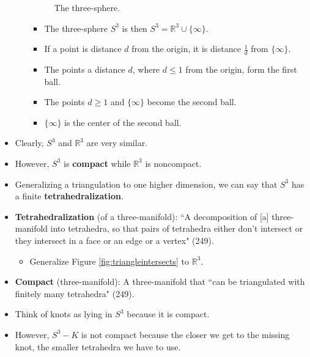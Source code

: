 \documentclass[titlepage]{article}
\numberwithin{figure}{section}
\numberwithin{table}{section}
\numberwithin{equation}{section}
\newcommand{\dq}[2]{``#1" (#2).}
\begin{document}
\begin{itemize}
\begin{itemize}
\begin{figure}[h!]
            \caption{The three-sphere.}
            \label{fig:3-sphere}
        \end{figure}
        \begin{itemize}
            \item The three-sphere $S^3$ is then $S^3=\mathbb{R}^3\cup\{\infty\}$.
            \item If a point is distance $d$ from the origin, it is distance $\frac{1}{d}$ from $\{\infty\}$.
            \item The points a distance $d$, where $d\leq 1$ from the origin, form the first ball.
            \item The points $d\geq 1$ and $\{\infty\}$ become the second ball.
            \item $\{\infty\}$ is the center of the second ball.
        \end{itemize}
    \end{itemize}
    \item Clearly, $S^3$ and $\mathbb{R}^3$ are very similar.
    \item However, $S^3$ is \textbf{compact} while $\mathbb{R}^3$ is noncompact.
    \item Generalizing a triangulation to one higher dimension, we can say that $S^3$ has a finite \textbf{tetrahedralization}.
    \item \textbf{Tetrahedralization} (of a three-manifold): \dq{A decomposition of [a] three-manifold into tetrahedra, so that pairs of tetrahedra either don't intersect or they intersect in a face or an edge or a vertex}{249}
    \begin{itemize}
        \item Generalize Figure \ref{fig:triangleintersects} to $\mathbb{R}^3$.
    \end{itemize}
    \item \textbf{Compact} (three-manifold): A three-manifold that \dq{can be triangulated with finitely many tetrahedra}{249}
    \item Think of knots as lying in $S^3$ because it is compact.
    \item However, $S^3-K$ is not compact because the closer we get to the missing knot, the smaller tetrahedra we have to use.

\end{itemize}
\end{document}
